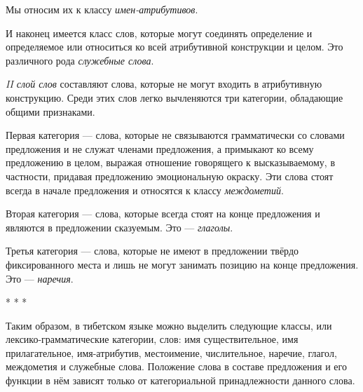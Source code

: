 Мы относим их к классу \emph{имен-атрибутивов}.

И наконец имеется класс слов, которые могут соединять определение и определяемое или относиться ко всей атрибутивной конструкции и целом. Это различного рода \emph{служебные слова}.

\emph{II слой слов} составляют слова, которые не могут входить в атрибутивную конструкцию. Среди этих слов легко вычленяются три категории, обладающие общими признаками.

Первая категория --- слова, которые не связываются грамматически со словами предложения и не служат членами предложения, а примыкают ко всему предложению в целом, выражая отношение говорящего к высказываемому, в частности, придавая предложению эмоциональную окраску. Эти слова стоят всегда в начале предложения и относятся к классу \emph{междометий}.

Вторая категория --- слова, которые всегда стоят на конце предложения и являются в предложении сказуемым. Это --- \emph{глаголы}.

Третья категория --- слова, которые не имеют в предложении твёрдо фиксированного места и лишь не могут занимать позицию на конце предложения. Это --- \emph{наречия}.

\begin{center}
* * *
\end{center}

Таким образом, в тибетском языке можно выделить следующие классы, или лексико-грамматические категории, слов: имя существительное, имя прилагательное, имя-атрибутив, местоимение, числительное, наречие, глагол, междометия и служебные слова. Положение слова в составе предложения и его функции в нём зависят только от категориальной принадлежности данного слова.